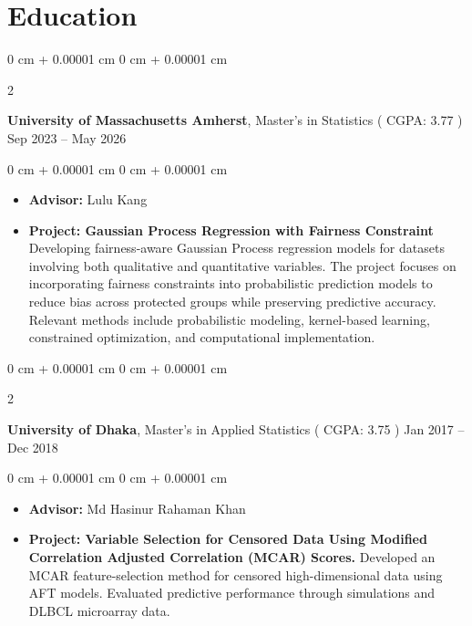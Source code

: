 \documentclass[10pt, letterpaper]{article}
\newenvironment{highlights}{
    \begin{itemize}[
        topsep=0.10 cm,
        parsep=0.10 cm,
        partopsep=0pt,
        itemsep=0pt,
        leftmargin=0 cm + 10pt
    ]
}{
    \end{itemize}
} %
\newenvironment{onecolentry}{
    \begin{adjustwidth}{
        0 cm + 0.00001 cm
    }{
        0 cm + 0.00001 cm
    }
}{
    \end{adjustwidth}
} %
\newenvironment{twocolentry}[2][]{
    \onecolentry
    \def\secondColumn{#2}
    \setcolumnwidth{\fill, 4.5 cm}
    \begin{paracol}{2}
}{
    \switchcolumn \raggedleft \secondColumn
    \end{paracol}
    \endonecolentry
} %
\begin{document}
        \vspace{0.2 cm}
    \section{Education}

        \begin{twocolentry}{
            Sep 2023 – May 2026
        }
            \textbf{University of Massachusetts Amherst}, Master's in Statistics ( CGPA: 3.77 )\end{twocolentry}

        \vspace{0.10 cm}
        \begin{onecolentry}
            \begin{highlights}
                \item \textbf{Advisor:} Lulu Kang
                \item \textbf{Project: Gaussian Process Regression with Fairness Constraint} Developing fairness-aware Gaussian Process regression models for datasets involving both qualitative and quantitative variables. The project focuses on incorporating fairness constraints into probabilistic prediction models to reduce bias across protected groups while preserving predictive accuracy. Relevant methods include probabilistic modeling, kernel-based learning, constrained optimization, and computational implementation.
            \end{highlights}
        \end{onecolentry}

    \vspace{0.20 cm}
    \begin{twocolentry}{
            Jan 2017 – Dec 2018
        }
            \textbf{University of Dhaka}, Master's in Applied Statistics ( CGPA: 3.75 )\end{twocolentry}
        \vspace{0.10 cm}
        \begin{onecolentry}
            \begin{highlights}
                \item \textbf{Advisor:} Md Hasinur Rahaman Khan
                \item \textbf{Project: Variable Selection for Censored Data Using Modified Correlation Adjusted Correlation (MCAR) Scores.} Developed an MCAR feature-selection method for censored high-dimensional data using AFT models. Evaluated predictive performance through simulations and DLBCL microarray data.
            \end{highlights}
        \end{onecolentry}
\end{document}
